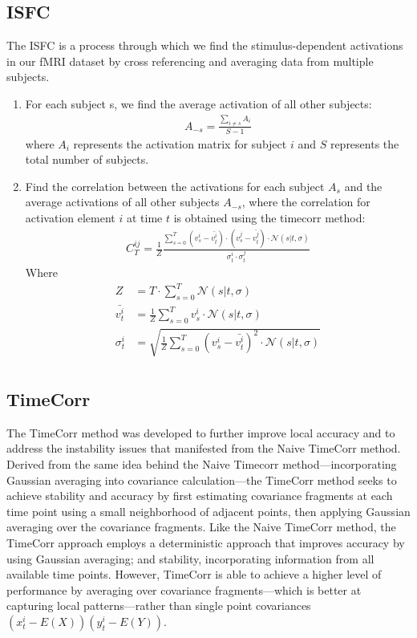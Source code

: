 \documentclass[12pt]{article}
\begin{document}
\subsection{ISFC}
The ISFC is a process through which we find the stimulus-dependent activations in our fMRI dataset by cross referencing and averaging data from multiple subjects.\\
\begin{enumerate}
\item For each subject s, we find the average activation of all other subjects:
\begin{align*}
A_{-s} = \frac{\sum_{i\neq s} A_i}{S-1}
\end{align*}
where $A_i$ represents the activation matrix for subject $i$ and $S$ represents the total number of subjects.
\item Find the correlation between the activations for each subject $A_s$ and the average activations of all other subjects $A_{-s}$, where the correlation for activation element $i$ at time $t$ is obtained using the timecorr method:
\begin{align*}
C^{ij}_T = \frac{1}{Z}\frac{\sum_{s=0}^T (v^i_s - \bar{v^i_t})\cdot(v^j_s - \bar{v^j_t})\cdot \mathcal{N}(s|t,\sigma)}{\sigma_t^i \cdot \sigma_t^j}
\end{align*}
Where
\begin{align*}
Z &= T\cdot \sum_{s=0}^T \mathcal{N}(s|t,\sigma)\\
\bar{v^i_t} &=\frac{1}{Z} \sum_{s=0}^T v^i_s \cdot \mathcal{N}(s|t,\sigma)\\
\sigma_t^i &=\sqrt{ \frac{1}{Z}\sum_{s=0}^T (v_s^i-\bar{v_t^i})^2 \cdot \mathcal{N}(s|t,\sigma)}\\
\end{align*}
\end{enumerate}

\subsection{TimeCorr}
The TimeCorr method was developed to further improve local accuracy and to address the instability issues that manifested from the Naive TimeCorr method. Derived from the same idea behind the Naive Timecorr method---incorporating Gaussian averaging into covariance calculation---the TimeCorr method seeks to achieve stability and accuracy by first estimating covariance fragments at each time point using a small neighborhood of adjacent points, then applying Gaussian averaging over the covariance fragments. Like the Naive TimeCorr method, the TimeCorr approach employs a deterministic approach that improves accuracy by using Gaussian averaging; and stability, incorporating information from all available time points. However, TimeCorr is able to achieve a higher level of performance by averaging over covariance fragments---which is better at capturing local patterns---rather than single point covariances $(x_t^i-E(X))(y_t^i-E(Y))$.\par
\end{document}
